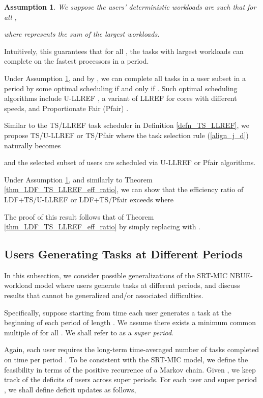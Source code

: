 \documentclass[prodmode,acmtompecs]{acmsmall}
\newtheorem{assumption}{\textbf{Assumption}}
\begin{document}
\begin{assumption}
\label{assumption_largest_workload_compatible}
We suppose the  users' deterministic workloads are such that for all , 

where  represents the sum of the  largest workloads. 
\end{assumption}

Intuitively, this guarantees that for all , the  tasks with largest workloads can complete on the  fastest processors in a period. 

Under Assumption \ref{assumption_largest_workload_compatible}, and by \cite{FGB01,FuM09}, we can complete all tasks in a user subset  in a period by some optimal scheduling if and only if . Such optimal scheduling algorithms include U-LLREF \cite{FuM09}, a variant of LLREF for cores with different speeds, and Proportionate Fair (Pfair) \cite{BCP96}. 

Similar to the TS/LLREF task scheduler in Definition \ref{defn_TS_LLREF}, we propose TS/U-LLREF or TS/Pfair where the task selection rule (\ref{align_j_d}) naturally becomes 

and the selected subset of users are scheduled via U-LLREF or Pfair algorithms. 

Under Assumption \ref{assumption_largest_workload_compatible}, and similarly to Theorem \ref{thm_LDF_TS_LLREF_eff_ratio}, we can show that the efficiency ratio of LDF+TS/U-LLREF or LDF+TS/Pfair exceeds  where

The proof of this result follows that of Theorem \ref{thm_LDF_TS_LLREF_eff_ratio} by simply replacing  with . 


\subsection{Users Generating Tasks at Different Periods}
In this subsection, we consider possible generalizations of the SRT-MIC NBUE-workload model where users generate tasks at different periods, and discuss results that cannot be generalized and/or associated difficulties. 

Specifically, suppose starting from time  each user  generates a task at the beginning of each period of length . We assume there exists a minimum common multiple  of  for all . We shall refer to  as a {\em super period}. 


Again, each user requires the long-term time-averaged number of tasks completed on time per period . To be consistent with the SRT-MIC  model, we define the feasibility in terms of the positive recurrence of a Markov chain. Given , we keep track of the deficits of users across super periods. For each user  and super period , we shall define deficit updates as follows,
\end{document}
